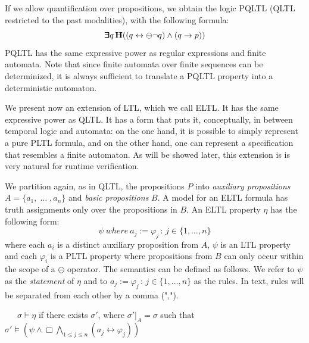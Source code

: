 If we allow
quantification over propositions, we obtain the logic PQLTL
(QLTL restricted to the past modalities), with the following formula:
\begin{equation} \label{form1} \bm{\exists}\kern-0.6em\bm{\exists} q \,
{\bf H} (( q \leftrightarrow \ominus \neg q )   \wedge (q \rightarrow p ) )\end{equation}
PQLTL has the same expressive
power as regular expressions and finite automata.
Note that since finite automata over finite sequences can be determinized, it is always sufficient to translate a
PQLTL property into a deterministic
automaton.




We present now an extension of LTL, which we call ELTL. It has the same
expressive power as  QLTL.
It has a form that puts it, conceptually, in between temporal
logic and automata: on the one hand, it is possible to simply represent
a pure PLTL formula, and on the other hand, one can represent a specification that resembles a finite automaton. As will be showed later, this extension is
is very natural for runtime verification.

We partition again, as in QLTL, the propositions $P$ into
{\em auxiliary propositions} $A = \{ a_1 , \; \ldots\; , a_n \}$
and {\em basic propositions} $B$. A model for an ELTL formula has truth assignments only over the propositions in $B$.
An ELTL property $\eta$ has the following form: 
\begin{equation} \label{ELTL}
\psi \mathit{\ where\ } a_j  := \varphi_j \, : \, 
 {j \in \{1, \ldots , n\}} \end{equation}
where each $a_i$ is a distinct auxiliary proposition from $A$,
$\psi$ is an LTL property and each $\varphi_i$ 
is a PLTL property where propositions from $B$ can
only occur within the scope of a $\ominus$ operator.
The semantics can be defined as follows. We refer to $\psi$
as the {\em statement} of $\eta$ and to 
$a_j  := \varphi_j \, : \, 
 {j \in \{1, \ldots , n\}}$ as the rules. In text, rules
 will be separated from each other by a comma (",").

\begin{tabbing}
\ \ \ $\sigma \models \eta$ \=  if there exists $\sigma'$, where
$\sigma' |_A = \sigma$ such that \\
 \> $\sigma' \models ( \psi  \wedge   \Box \bigwedge_{1 \leq j \leq n} ( a_j \leftrightarrow \varphi_j)) $
\end{tabbing}

